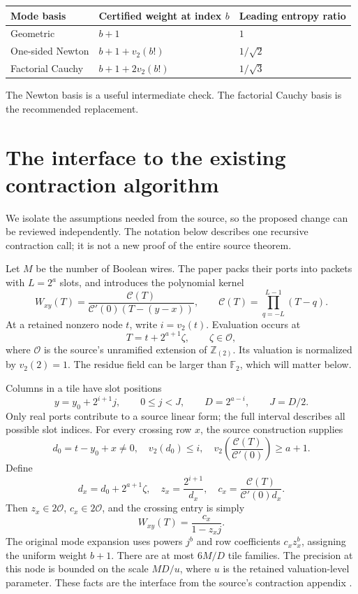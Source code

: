 \documentclass[11pt]{article}
\theoremstyle{remark}
\newcommand{\OO}{\mathcal O}
\newcommand{\Ztwo}{\mathbb Z_{(2)}}
\newcommand{\CP}{\mathcal C}
\begin{document}
\begin{center}
\begin{tabular}{@{}lll@{}}
\toprule
Mode basis & Certified weight at index $b$ & Leading entropy ratio\\
\midrule
Geometric & $b+1$ & $1$\\
One-sided Newton & $b+1+v_2(b!)$ & $1/\sqrt2$\\
Factorial Cauchy & $b+1+2v_2(b!)$ & $1/\sqrt3$\\
\bottomrule
\end{tabular}
\end{center}
The Newton basis is a useful intermediate check. The factorial Cauchy basis is the recommended replacement.

\section{The interface to the existing contraction algorithm}\label{sec:interface}

We isolate the assumptions needed from the source, so the proposed change can be reviewed independently. The notation below describes one recursive contraction call; it is not a new proof of the entire source theorem.

Let $M$ be the number of Boolean wires. The paper packs their ports into packets with $L=2^a$ slots, and introduces the polynomial kernel
\begin{equation}\label{eq:paper-kernel}
 W_{xy}(T)=\frac{\CP(T)}{\CP'(0)(T-(y-x))},\qquad
 \CP(T)=\prod_{q=-L}^{L-1}(T-q).
\end{equation}
At a retained nonzero node $t$, write $i=v_2(t)$. Evaluation occurs at
\[
 T=t+2^{a+1}\zeta,\qquad \zeta\in\OO,
\]
where $\OO$ is the source's unramified extension of $\Ztwo$. Its valuation is normalized by $v_2(2)=1$. The residue field can be larger than $\mathbb F_2$, which will matter below.

Columns in a tile have slot positions
\[
 y=y_0+2^{i+1}j,\qquad 0\le j<J,
 \qquad D=2^{a-i},\qquad J=D/2.
\]
Only real ports contribute to a source linear form; the full interval describes all possible slot indices. For every crossing row $x$, the source construction supplies
\begin{equation}\label{eq:source-crossing-facts}
 d_0=t-y_0+x\ne0,\quad v_2(d_0)\le i,\quad
 v_2\!\left(\frac{\CP(T)}{\CP'(0)}\right)\ge a+1.
\end{equation}
Define
\begin{equation}\label{eq:normalized-kernel}
 d_x=d_0+2^{a+1}\zeta,\quad
 z_x=\frac{2^{i+1}}{d_x},\quad
 c_x=\frac{\CP(T)}{\CP'(0)d_x}.
\end{equation}
Then $z_x\in2\OO$, $c_x\in2\OO$, and the crossing entry is simply
\begin{equation}\label{eq:normalized}
 W_{xy}(T)=\frac{c_x}{1-z_xj}.
\end{equation}
The original mode expansion uses powers $j^b$ and row coefficients $c_xz_x^b$, assigning the uniform weight $b+1$. There are at most $6M/D$ tile families. The precision at this node is bounded on the scale $MD/u$, where $u$ is the retained valuation-level parameter. These facts are the interface from the source's contraction appendix \cite{contraction}.
\end{document}

